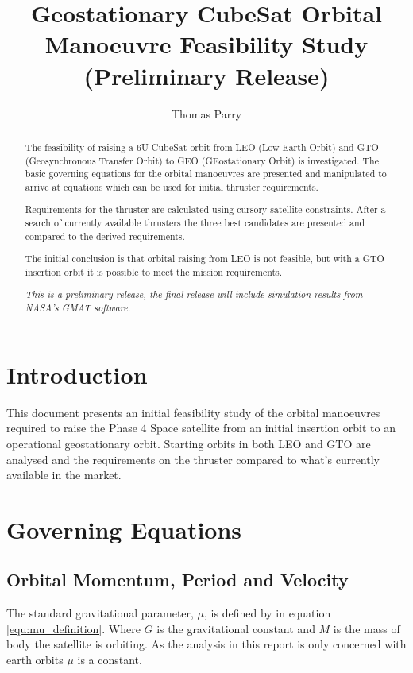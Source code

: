 \documentclass[a4paper, article, oneside, UKenglish]{memoir}
\title{Geostationary CubeSat Orbital Manoeuvre Feasibility Study (Preliminary Release)}
\author{Thomas Parry}
\newcommand{\0}{\mathbf{0}}
\newcommand{\1}{\mathbf{1}}
\begin{document}
\projectfrontpage


\begin{abstract}
    \noindent
    The feasibility of raising a 6U CubeSat orbit from LEO (Low Earth Orbit) and GTO (Geosynchronous Transfer Orbit) to GEO (GEostationary Orbit) is investigated. The basic governing equations for the orbital manoeuvres are presented and manipulated to arrive at equations which can be used for initial thruster requirements.  
    
    Requirements for the thruster are calculated using cursory satellite constraints.  After a search of currently available thrusters the three best candidates are presented and compared to the derived requirements.  
    
    The initial conclusion is that orbital raising from LEO is not feasible, but with a GTO insertion orbit it is possible to meet the mission requirements.
    
    \textit{This is a preliminary release, the final release will include simulation results from NASA's GMAT software.}
\end{abstract}

\newpage

\chapter{Introduction}


This document presents an initial feasibility study of the orbital manoeuvres required to raise the Phase 4 Space satellite from an initial insertion orbit to an operational geostationary orbit.  Starting orbits in both LEO and GTO are analysed and the requirements on the thruster compared to what's currently available in the market.



\chapter{Governing Equations}

\section{Orbital Momentum, Period and Velocity}

The standard gravitational parameter, $ \mu $, is defined by in equation \ref{equ:mu_definition}. Where $ G $ is the gravitational constant and $ M $ is the mass of body the satellite is orbiting. As the analysis in this report is only concerned with earth orbits $ \mu $ is a constant.
\end{document}
